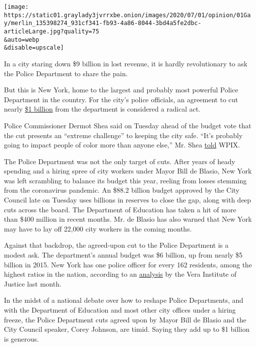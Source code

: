 \texttt{[image: https://static01.graylady3jvrrxbe.onion/images/2020/07/01/opinion/01Gay/merlin\_135398274\_931cf341-fb93-4a86-8044-3bd4a5fe2dbc-articleLarge.jpg?quality=75\\\&auto=webp\\\&disable=upscale]}

In a city staring down \$9 billion in lost revenue, it is hardly
revolutionary to ask the Police Department to share the pain.

But this is New York, home to the largest and probably most powerful
Police Department in the country. For the city's police officials, an
agreement to cut nearly
\href{https://www.nytimes3xbfgragh.onion/2020/06/29/nyregion/nyc-budget-police.html}{\$1
billion} from the department is considered a radical act.

Police Commissioner Dermot Shea said on Tuesday ahead of the budget vote
that the cut presents an ``extreme challenge'' to keeping the city safe.
``It's probably going to impact people of color more than anyone else,''
Mr. Shea
\href{https://www.pix11.com/news/america-in-crisis/police-commissioner-weighs-in-on-clash-with-protesters-nypd-budget-cuts}{told}
WPIX.

The Police Department was not the only target of cuts. After years of
heady spending and a hiring spree of city workers under Mayor Bill de
Blasio, New York was left scrambling to balance its budget this year,
reeling from losses stemming from the coronavirus pandemic. An \$88.2
billion budget approved by the City Council late on Tuesday uses
billions in reserves to close the gap, along with deep cuts across the
board. The Department of Education has taken a hit of more than \$400
million in recent months. Mr. de Blasio has also warned that New York
may have to lay off 22,000 city workers in the coming months.

Against that backdrop, the agreed-upon cut to the Police Department is a
modest ask. The department's annual budget was \$6 billion, up from
nearly \$5 billion in 2015. New York has one police officer for every
162 residents, among the highest ratios in the nation, according to an
\href{https://www.vera.org/publications/what-policing-costs-in-americas-biggest-cities}{analysis}
by the Vera Institute of Justice last month.

In the midst of a national debate over how to reshape Police
Departments, and with the Department of Education and most other city
offices under a hiring freeze, the Police Department cuts agreed upon by
Mayor Bill de Blasio and the City Council speaker, Corey Johnson, are
timid. Saying they add up to \$1 billion is generous.

